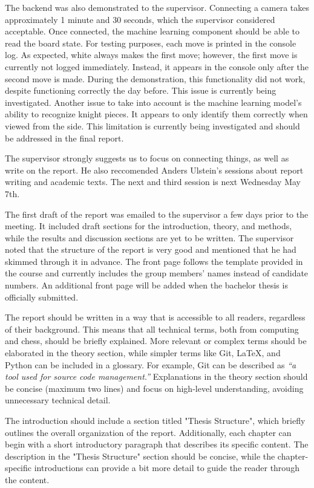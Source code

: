 The backend was also demonstrated to the supervisor. Connecting a camera takes approximately 1 minute and 30 seconds, which the supervisor considered acceptable. Once connected, the machine learning component should be able to read the board state. For testing purposes, each move is printed in the console log. As expected, white always makes the first move; however, the first move is currently not logged immediately. Instead, it appears in the console only after the second move is made. During the demonstration, this functionality did not work, despite functioning correctly the day before. This issue is currently being investigated. Another issue to take into account is the machine learning model’s ability to recognize knight pieces. It appears to only identify them correctly when viewed from the side. This limitation is currently being investigated and should be addressed in the final report. 

The supervisor strongly suggests us to focus on connecting things, as well as write on the report. He also reccomended Anders Ulstein's sessions about report writing and academic texts. The next and third session is next Wednesday May 7th.  

The first draft of the report was emailed to the supervisor a few days prior to the meeting. It included draft sections for the introduction, theory, and methods, while the results and discussion sections are yet to be written. The supervisor noted that the structure of the report is very good and mentioned that he had skimmed through it in advance. The front page follows the template provided in the course and currently includes the group members' names instead of candidate numbers. An additional front page will be added when the bachelor thesis is officially submitted.

The report should be written in a way that is accessible to all readers, regardless of their background. This means that all technical terms, both from computing and chess, should be briefly explained. More relevant or complex terms should be elaborated in the theory section, while simpler terms like Git, LaTeX, and Python can be included in a glossary. For example, Git can be described as \textit{“a tool used for source code management.”} Explanations in the theory section should be concise (maximum two lines) and focus on high-level understanding, avoiding unnecessary technical detail.

The introduction should include a section titled "Thesis Structure", which briefly outlines the overall organization of the report. Additionally, each chapter can begin with a short introductory paragraph that describes its specific content. The description in the "Thesis Structure" section should be concise, while the chapter-specific introductions can provide a bit more detail to guide the reader through the content.

